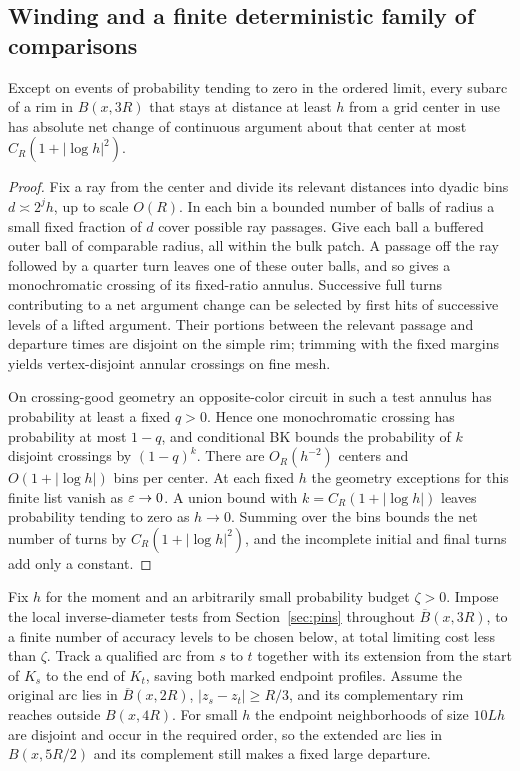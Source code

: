 \subsection{Winding and a finite deterministic family of comparisons}

\begin{lemma}\label{lemma:winding}
Except on events of probability tending to zero in the ordered limit,
every subarc of a rim in $B(x,3R)$ that stays at distance at least $h$
from a grid center in use has absolute net change of continuous
argument about that center at most
$C_R(1+|\log h|^2)$.
\end{lemma}

\begin{proof}
Fix a ray from the center and divide its relevant distances into
dyadic bins $d\asymp 2^jh$, up to scale $O(R)$.  In each bin a bounded
number of balls of radius a small fixed fraction of $d$ cover possible
ray passages.  Give each ball a buffered outer ball of comparable
radius, all within the bulk patch.  A passage off the ray followed
by a quarter turn leaves one of these outer balls, and so gives a
monochromatic crossing of its fixed-ratio annulus.  Successive full
turns contributing to a net argument change can be selected by first
hits of successive levels of a lifted argument.  Their portions
between the relevant passage and departure times are disjoint on the
simple rim; trimming with the fixed margins yields vertex-disjoint
annular crossings on fine mesh.

On crossing-good geometry an opposite-color circuit in such a test
annulus has probability at least a fixed $q>0$.  Hence one
monochromatic crossing has probability at most $1-q$, and conditional
BK bounds the probability of $k$ disjoint crossings by $(1-q)^k$.
There are $O_R(h^{-2})$ centers and $O(1+|\log h|)$ bins per center.
At each fixed $h$ the geometry exceptions for this finite list vanish
as $\varepsilon\to0$.  A union bound with
$k=C_R(1+|\log h|)$ leaves probability tending to zero as $h\to0$.
Summing over the bins bounds the net number of turns by
$C_R(1+|\log h|^2)$, and the incomplete initial and final turns add
only a constant.
\end{proof}

Fix $h$ for the moment and an arbitrarily small probability budget
$\zeta>0$.  Impose the local inverse-diameter tests from
Section~\ref{sec:pins} throughout $\overline B(x,3R)$, to a finite
number of accuracy levels to be chosen below, at total limiting cost
less than $\zeta$.  Track a qualified arc from $s$ to $t$ together
with its extension from the start of $K_s$ to the end of $K_t$, saving
both marked endpoint profiles.  Assume the original arc lies in
$\overline B(x,2R)$, $|z_s-z_t|\ge R/3$, and its complementary rim
reaches outside $B(x,4R)$.  For small $h$ the endpoint neighborhoods
of size $10Lh$ are disjoint and occur in the required order, so the
extended arc lies in $B(x,5R/2)$ and its complement still makes a
fixed large departure.

